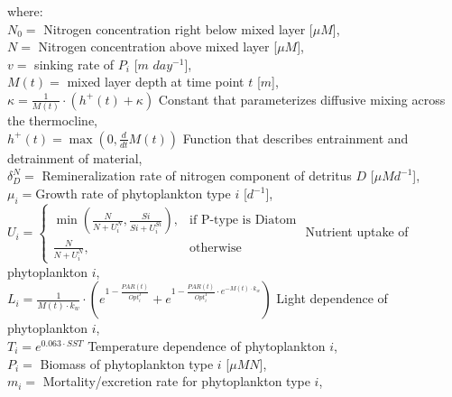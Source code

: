 where:\\
\mbox{} \hspace{.5cm} $N_0=$ Nitrogen concentration right below mixed layer [$\mu M$],\\
\mbox{} \hspace{.5cm} $N=$ Nitrogen concentration above mixed layer [$\mu M$],\\
\mbox{} \hspace{.5cm} $v=$ sinking rate of $P_i$ [$m$ $day^{-1}$],\\
\mbox{} \hspace{.5cm} $M(t)=$ mixed layer depth at time point $t$ [$m$],\\
\mbox{} \hspace{.5cm} $\kappa = \frac{1}{M(t)} \cdot \left(h^{+}(t) + \kappa\right)$ Constant that parameterizes diffusive mixing across the thermocline, \\
\mbox{} \hspace{.5cm} $h^{+}(t) = \max\left(0, \frac{d}{d t} M(t)\right)$ Function that describes entrainment and detrainment of material,\\
\mbox{} \hspace{.5cm} $\delta^N_D=$ Remineralization rate of nitrogen component of detritus $D$ [$\mu M d^{-1}$],\\
\mbox{} \hspace{.5cm} $\mu_i=$Growth rate of phytoplankton type $i$ [$d^{-1}$],\\


\mbox{} \hspace{.5cm} $U_i=\begin{cases}\min\left(\frac{N}{N + U^{N}_i}, \frac{Si}{Si + U^{Si}_i}\right),& \text{if P-type is Diatom}\\\frac{N}{N + U^{N}_i}, & \text{otherwise}\end{cases}$ Nutrient uptake of phytoplankton $i$,\\

\mbox{} \hspace{.5cm} $L_i=\frac{1}{M(t) \cdot k_{w}} \cdot \left(e^{1 - \frac{PAR(t)}{Opt^{I}_i}} + e^{1 - \frac{PAR(t)}{Opt^{I}_i} \cdot e^{- M(t) \cdot k_{w}}}\right)$ Light dependence of  phytoplankton $i$,\\
\mbox{} \hspace{.5cm} $T_i= e^{0.063 \cdot SST}$ Temperature dependence of phytoplankton $i$,\\

\mbox{} \hspace{.5cm} $P_i=$ Biomass of phytoplankton type $i$ [$\mu M N$],\\
\mbox{} \hspace{.5cm} $m_i=$ Mortality/excretion rate for phytoplankton type $i$,\\

